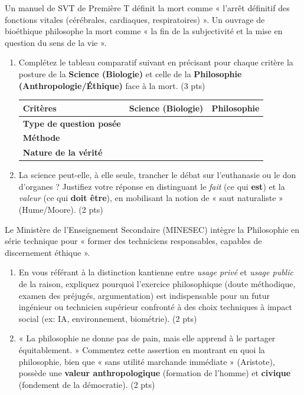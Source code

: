 \documentclass[11pt]{article}
\begin{document}
\begin{exercice}
Un manuel de SVT de Première T définit la mort comme « l'arrêt définitif des fonctions vitales (cérébrales, cardiaques, respiratoires) ». Un ouvrage de bioéthique philosophe la mort comme « la fin de la subjectivité et la mise en question du sens de la vie ».
\begin{enumerate}
    \item Complétez le tableau comparatif suivant en précisant pour chaque critère la posture de la \textbf{Science (Biologie)} et celle de la \textbf{Philosophie (Anthropologie/Éthique)} face à la mort. (3 pts)
    \begin{tabularx}{\linewidth}{>{\bfseries}l X X}
        \toprule
        \textbf{Critères} & \textbf{Science (Biologie)} & \textbf{Philosophie} \\
        \midrule
        Type de question posée &  &  \\
        Méthode &  &  \\
        Nature de la vérité &  &  \\
        \bottomrule
    \end{tabularx}
    \item La science peut-elle, à elle seule, trancher le débat sur l'euthanasie ou le don d'organes ? Justifiez votre réponse en distinguant le \textit{fait} (ce qui \textbf{est}) et la \textit{valeur} (ce qui \textbf{doit être}), en mobilisant la notion de « saut naturaliste » (Hume/Moore). (2 pts)
\end{enumerate}
\end{exercice}

\begin{exercice}
Le Ministère de l'Enseignement Secondaire (MINESEC) intègre la Philosophie en série technique pour « former des techniciens responsables, capables de discernement éthique ».
\begin{enumerate}
    \item En vous référant à la distinction kantienne entre \textit{usage privé} et \textit{usage public} de la raison, expliquez pourquoi l'exercice philosophique (doute méthodique, examen des préjugés, argumentation) est indispensable pour un futur ingénieur ou technicien supérieur confronté à des choix techniques à impact social (ex: IA, environnement, biométrie). (2 pts)
    \item « La philosophie ne donne pas de pain, mais elle apprend à le partager équitablement. » Commentez cette assertion en montrant en quoi la philosophie, bien que « sans utilité marchande immédiate » (Aristote), possède une \textbf{valeur anthropologique} (formation de l'homme) et \textbf{civique} (fondement de la démocratie). (2 pts)
\end{enumerate}
\end{exercice}
\end{document}
